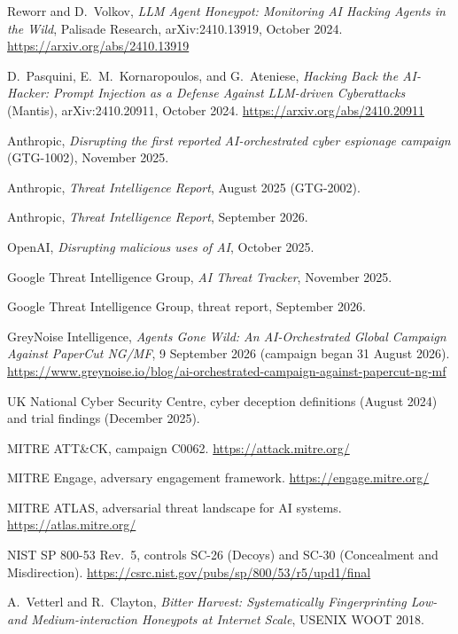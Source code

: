 \documentclass[11pt,letterpaper]{article}
\begin{document}
\begingroup
\small
{}
\begin{enumerate}[label={\textcolor{deepindigo}{[\arabic*]}}, leftmargin=2.4em, itemsep=0.4em]
  \item Reworr and D.~Volkov, \emph{LLM Agent Honeypot: Monitoring AI Hacking Agents in the Wild}, Palisade Research, arXiv:2410.13919, October 2024. \url{https://arxiv.org/abs/2410.13919}
  \item D.~Pasquini, E.~M.~Kornaropoulos, and G.~Ateniese, \emph{Hacking Back the AI-Hacker: Prompt Injection as a Defense Against LLM-driven Cyberattacks} (Mantis), arXiv:2410.20911, October 2024. \url{https://arxiv.org/abs/2410.20911}
  \item Anthropic, \emph{Disrupting the first reported AI-orchestrated cyber espionage campaign} (GTG-1002), November 2025.
  \item Anthropic, \emph{Threat Intelligence Report}, August 2025 (GTG-2002).
  \item Anthropic, \emph{Threat Intelligence Report}, September 2026.
  \item OpenAI, \emph{Disrupting malicious uses of AI}, October 2025.
  \item Google Threat Intelligence Group, \emph{AI Threat Tracker}, November 2025.
  \item Google Threat Intelligence Group, threat report, September 2026.
  \item GreyNoise Intelligence, \emph{Agents Gone Wild: An AI-Orchestrated Global Campaign Against PaperCut NG/MF}, 9 September 2026 (campaign began 31 August 2026). \url{https://www.greynoise.io/blog/ai-orchestrated-campaign-against-papercut-ng-mf}
  \item UK National Cyber Security Centre, cyber deception definitions (August 2024) and trial findings (December 2025).
  \item MITRE ATT\&CK, campaign C0062. \url{https://attack.mitre.org/}
  \item MITRE Engage, adversary engagement framework. \url{https://engage.mitre.org/}
  \item MITRE ATLAS, adversarial threat landscape for AI systems. \url{https://atlas.mitre.org/}
  \item NIST SP 800-53 Rev.~5, controls SC-26 (Decoys) and SC-30 (Concealment and Misdirection). \url{https://csrc.nist.gov/pubs/sp/800/53/r5/upd1/final}
  \item A.~Vetterl and R.~Clayton, \emph{Bitter Harvest: Systematically Fingerprinting Low- and Medium-interaction Honeypots at Internet Scale}, USENIX WOOT 2018.

\end{enumerate}
\end{document}

